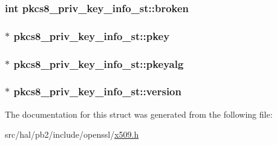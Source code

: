 \subsubsection[{\texorpdfstring{broken}{broken}}]{\setlength{\rightskip}{0pt plus 5cm}int pkcs8\+\_\+priv\+\_\+key\+\_\+info\+\_\+st\+::broken}\hypertarget{structpkcs8__priv__key__info__st_a0c1159bfe2a447810dc518175c77c225}{}\label{structpkcs8__priv__key__info__st_a0c1159bfe2a447810dc518175c77c225}
\subsubsection[{\texorpdfstring{pkey}{pkey}}]{$\ast$ pkcs8\+\_\+priv\+\_\+key\+\_\+info\+\_\+st\+::pkey}\hypertarget{structpkcs8__priv__key__info__st_aba8fbcabba1fdcf6ff0f41901a9b042c}{}\label{structpkcs8__priv__key__info__st_aba8fbcabba1fdcf6ff0f41901a9b042c}
\subsubsection[{\texorpdfstring{pkeyalg}{pkeyalg}}]{$\ast$ pkcs8\+\_\+priv\+\_\+key\+\_\+info\+\_\+st\+::pkeyalg}\hypertarget{structpkcs8__priv__key__info__st_af94f0f4f185de14be5b0b88bb638b3e8}{}\label{structpkcs8__priv__key__info__st_af94f0f4f185de14be5b0b88bb638b3e8}
\subsubsection[{\texorpdfstring{version}{version}}]{$\ast$ pkcs8\+\_\+priv\+\_\+key\+\_\+info\+\_\+st\+::version}\hypertarget{structpkcs8__priv__key__info__st_a5e3bdcbf50b8971fcb60a8f7d71a36fb}{}\label{structpkcs8__priv__key__info__st_a5e3bdcbf50b8971fcb60a8f7d71a36fb}


The documentation for this struct was generated from the following file\+:\begin{DoxyCompactItemize}
\item 
src/hal/pb2/include/openssl/\hyperlink{x509_8h}{x509.\+h}\end{DoxyCompactItemize}
